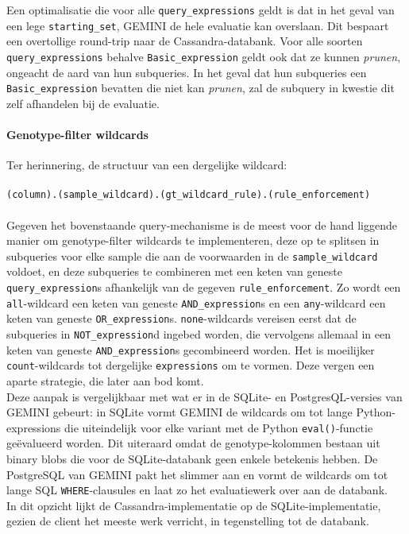 Een optimalisatie die voor alle \texttt{query\_expressions} geldt is dat in het geval van een lege \texttt{starting\_set}, GEMINI de hele evaluatie kan overslaan. Dit bespaart een overtollige round-trip naar de Cassandra-databank. Voor alle soorten \texttt{query\_expressions} behalve \texttt{Basic\_expression} geldt ook dat ze kunnen \textit{prunen}, ongeacht de aard van hun subqueries. In het geval dat hun subqueries een \texttt{Basic\_expression} bevatten die niet kan \textit{prunen}, zal de subquery in kwestie dit zelf afhandelen bij de evaluatie.

\paragraph{Genotype-filter wildcards}

Ter herinnering, de structuur van een dergelijke wildcard:\\\\
\texttt{(column).(sample\_wildcard).(gt\_wildcard\_rule).(rule\_enforcement)}\\\\
Gegeven het bovenstaande query-mechanisme is de meest voor de hand liggende manier om genotype-filter wildcards te implementeren, deze op te splitsen in subqueries voor elke sample die aan de voorwaarden in de \texttt{sample\_wildcard} voldoet, en deze subqueries te combineren met een keten van geneste \texttt{query\_expression}s afhankelijk van de gegeven \texttt{rule\_enforcement}. Zo wordt een \texttt{all}-wildcard een keten van geneste \texttt{AND\_expression}s en een \texttt{any}-wildcard een keten van geneste \texttt{OR\_expression}s. \texttt{none}-wildcards vereisen eerst dat de subqueries in \texttt{NOT\_expression}d ingebed worden, die vervolgens allemaal in een keten van geneste \texttt{AND\_expression}s gecombineerd worden. Het is moeilijker \texttt{count}-wildcards tot dergelijke \texttt{expressions} om te vormen. Deze vergen een aparte strategie, die later aan bod komt.\\
Deze aanpak is vergelijkbaar met wat er in de SQLite- en PostgresQL-versies van GEMINI gebeurt: in SQLite vormt GEMINI de wildcards om tot lange Python-expressions die uiteindelijk voor elke variant met de Python \texttt{eval()}-functie ge\"evalueerd worden. Dit uiteraard omdat de genotype-kolommen bestaan uit binary blobs die voor de SQLite-databank geen enkele betekenis hebben. De PostgreSQL van GEMINI pakt het slimmer aan en vormt de wildcards om tot lange SQL \texttt{WHERE}-clausules en laat zo het evaluatiewerk over aan de databank.\\
In dit opzicht lijkt de Cassandra-implementatie op de SQLite-implementatie, gezien de client het meeste werk verricht, in tegenstelling tot de databank.

